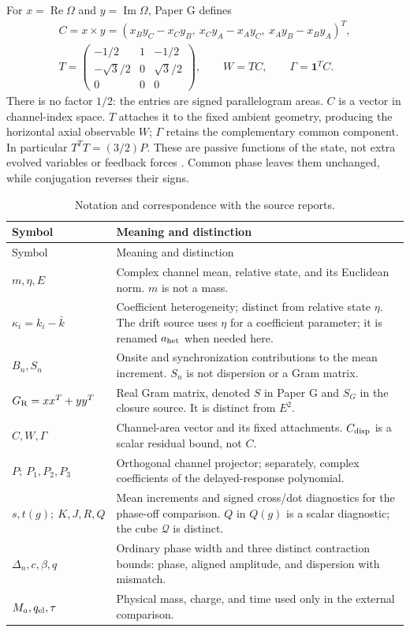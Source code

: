 \documentclass[11pt,a4paper]{article}
\numberwithin{equation}{section}
\theoremstyle{remark}\newtheorem{remark}[theorem]{Remark}
\newcommand{\one}{\mathbf1}\newcommand{\eps}{\varepsilon}
\newcommand{\re}{\operatorname{Re}}\newcommand{\im}{\operatorname{Im}}
\begin{document}
For $x=\re\Omega$ and $y=\im\Omega$, Paper G defines
\begin{gather}
C=x\times y=(x_By_C-x_Cy_B,\ x_Cy_A-x_Ay_C,\ x_Ay_B-x_By_A)^T,\label{eq:area}\\
T=\begin{pmatrix}-1/2&1&-1/2\\-\sqrt3/2&0&\sqrt3/2\\0&0&0\end{pmatrix},
\qquad W=TC,\qquad\Gamma=\one^TC.\label{eq:attach}
\end{gather}
There is no factor $1/2$: the entries are signed parallelogram areas. $C$ is a vector in channel-index space. $T$ attaches it to the fixed ambient geometry, producing the horizontal axial observable $W$; $\Gamma$ retains the complementary common component. In particular $T^TT=(3/2)P$. These are passive functions of the state, not extra evolved variables or feedback forces \cite{paperG,closure}. Common phase leaves them unchanged, while conjugation reverses their signs.

\begin{longtable}{@{}p{}p{}@{}}
\caption{Notation and correspondence with the source reports.}\label{tab:notation}\\\toprule
Symbol & Meaning and distinction\\\midrule\endfirsthead
\toprule Symbol & Meaning and distinction\\\midrule\endhead
$m,\eta,E$ & Complex channel mean, relative state, and its Euclidean norm. $m$ is not a mass.\\
$\kappa_i=k_i-\bar k$ & Coefficient heterogeneity; distinct from relative state $\eta$. The drift source uses $\eta$ for a coefficient parameter; it is renamed $a_{\rm het}$ when needed here.\\
$B_n,S_n$ & Onsite and synchronization contributions to the mean increment. $S_n$ is not dispersion or a Gram matrix.\\
$G_{\rm R}=xx^T+yy^T$ & Real Gram matrix, denoted $S$ in Paper G and $S_G$ in the closure source. It is distinct from $E^2$.\\
$C,W,\Gamma$ & Channel-area vector and its fixed attachments. $C_{\rm disp}$ is a scalar residual bound, not $C$.\\
$P;\ P_1,P_2,P_3$ & Orthogonal channel projector; separately, complex coefficients of the delayed-response polynomial.\\
$s,t(g);\ K,J,R,Q$ & Mean increments and signed cross/dot diagnostics for the phase-off comparison. $Q$ in $Q(g)$ is a scalar diagnostic; the cube $\mathcal Q$ is distinct.\\
$\Delta_n,c,\beta,q$ & Ordinary phase width and three distinct contraction bounds: phase, aligned amplitude, and dispersion with mismatch.\\
$M_a,q_{\rm el},\tau$ & Physical mass, charge, and time used only in the external comparison.\\\bottomrule
\end{longtable}
\end{document}
